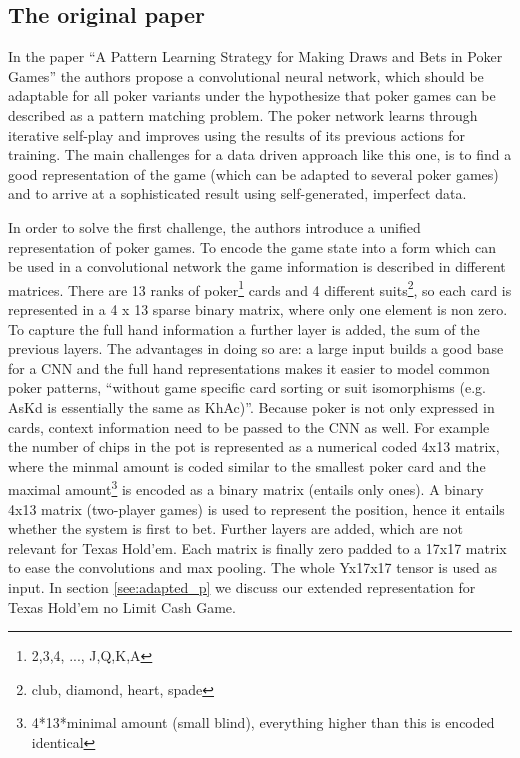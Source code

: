 \documentclass[]{report}
\begin{document}
\subsection{The original paper}

In the paper ``A Pattern Learning Strategy for Making Draws and Bets
in Poker Games''\cite{1} the authors propose a convolutional neural
network, which should be adaptable for all poker variants under the
hypothesize that poker games can be described as a pattern matching
problem. The poker network learns through iterative self-play and
improves using the results of its previous actions for training. The
main challenges for a data driven approach like this one, is to find
a good representation of the game (which can be adapted to several
poker games) and to arrive at a sophisticated result using self-generated,
imperfect data.

In order to solve the first challenge, the authors introduce a unified
representation of poker games. To encode the game state into a form
which can be used in a convolutional network the game information
is described in different matrices. There are 13 ranks of poker\footnote{2,3,4, ..., J,Q,K,A}
cards and 4 different suits\footnote{club, diamond, heart, spade},
so each card is represented in a 4 x 13 sparse binary matrix, where
only one element is non zero. To capture the full hand information
a further layer is added, the sum of the previous layers. The advantages
in doing so are: a large input builds a good base for a CNN and the
full hand representations makes it easier to model common poker patterns,
``without game specific card sorting or suit isomorphisms (e.g. AsKd
is essentially the same as KhAc)''.\cite{1} Because poker is not
only expressed in cards, context information need to be passed to
the CNN as well. For example the number of chips in the pot is represented
as a numerical coded 4x13 matrix, where the minmal amount is coded
similar to the smallest poker card and the maximal amount\footnote{4{*}13{*}minimal amount (small blind), everything higher than this
is encoded identical} is encoded as a binary matrix (entails only ones). A binary 4x13
matrix (two-player games) is used to represent the position, hence
it entails whether the system is first to bet. Further layers are
added, which are not relevant for Texas Hold'em. Each matrix is finally
zero padded to a 17x17 matrix to ease the convolutions and max pooling.
The whole Yx17x17 tensor is used as input. In section \ref{see:adapted_p}
we discuss our extended representation for Texas Hold'em no Limit
Cash Game.
\end{document}
